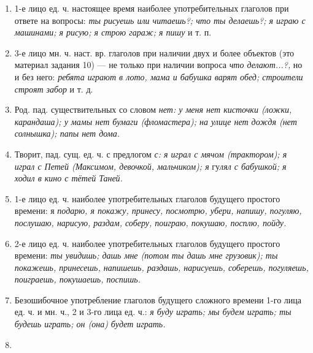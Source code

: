\documentclass{book}
\renewcommand{\emph}[1]{\textit{#1}}
\begin{document}
\begin{enumerate}
\def\labelenumi{\arabic{enumi}.}
\item
  
  1-е лицо ед. ч. настоящее время наиболее употребительных глаголов при
  ответе на вопросы: \emph{ты рисуешь или читаешь?; что ты делаешь?; я
  играю с машинами; я рисую; я строю гараж; я пишу} и т. п.
  
\item
  
  3-е лицо мн. ч. наст. вр. глаголов при наличии двух и более объектов
  (это материал задания 10) --- не только при наличии вопроса \emph{что
  делают...?,} но и без него: \emph{ребята играют в лото, мама и бабушка
  варят обед; строители строят забор} и т. д.
  
\item
  
  Род. пад. существительных со словом \emph{нет: у меня нет кисточки
  (ложки, карандаша); у мамы нет бумаги (фломастера); на улице нет дождя
  (нет солнышка); папы нет дома.}
  
\item
  
  Творит, пад. сущ. ед. ч. с предлогом \emph{с: я играл с мячом
  (трактором); я играл с Петей (Максимом, девочкой, мальчиком); я}
  гу\emph{лял с бабушкой; я ходил в кино с тётей Таней.}
  
\item
  
  1-е лицо ед. ч. наиболее употребительных глаголов будущего простого
  времени: я \emph{подарю, я покажу, принесу, посмотрю, убери, напишу,
  погуляю, послушаю, нарисую, раздам, соберу, поиграю, покушаю, посплю,
  пойду.}
  
\item
  
  2-е лицо ед. ч. наиболее употребительных глаголов будущего простого
  времени: \emph{ты увидишь; дашь мне (потом ты дашь мне грузовик); ты
  покажешь, принесешь, напишешь, раздашь, нарисуешь, соберешь,
  погуляешь, поиграешь, покушаешь, поспишь.}
  
\item
  
  Безошибочное употребление глаголов будущего сложного времени 1-го лица
  ед. ч. и мн. ч., 2 и 3-го лица ед. ч.: \emph{я буду играть; мы будем
  играть; ты будешь играть; он (она) будет играть.}
  
\item
  

\end{enumerate}
\end{document}
